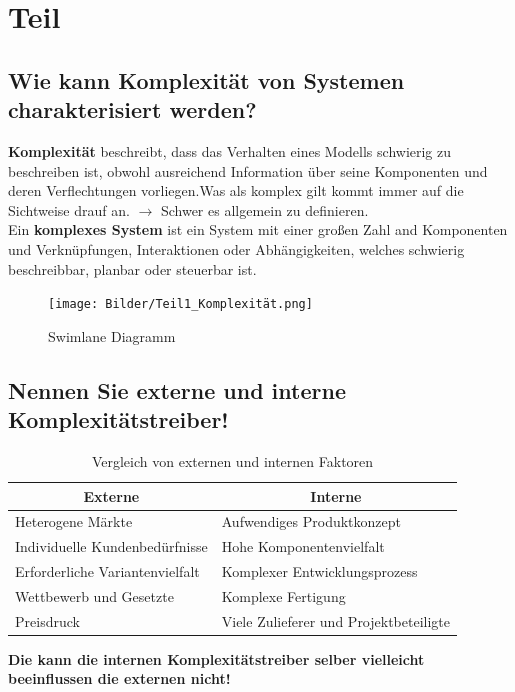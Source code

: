 \section{Teil}

\subsection{Wie kann Komplexität von Systemen charakterisiert werden?}
\textbf{Komplexität} beschreibt, dass das Verhalten eines Modells schwierig zu beschreiben ist, obwohl ausreichend Information über seine Komponenten
 und deren Verflechtungen vorliegen.Was als komplex gilt kommt immer auf die Sichtweise drauf an. $\rightarrow$ Schwer es allgemein zu definieren.
\\

Ein \textbf{komplexes System} ist ein System mit einer großen Zahl and Komponenten und Verknüpfungen, Interaktionen oder Abhängigkeiten, 
welches schwierig beschreibbar, planbar oder steuerbar ist.

\begin{figure}[H]
	\centering
	\texttt{[image: Bilder/Teil1\_Komplexität.png]}
	\caption{Swimlane Diagramm}
\end{figure}

\subsection{Nennen Sie externe und interne Komplexitätstreiber!}
	

\begin{table}[h!]
	\centering
	\begin{tabular}{|p{7cm}|p{7cm}|}
		\hline
		\multicolumn{1}{|c|}{\textbf{Externe}} & \multicolumn{1}{c|}{\textbf{Interne}} \\ \hline
		Heterogene Märkte & Aufwendiges Produktkonzept \\ \hline
		Individuelle Kundenbedürfnisse & Hohe Komponentenvielfalt \\ \hline
		Erforderliche Variantenvielfalt & Komplexer Entwicklungsprozess \\ \hline
		Wettbewerb und Gesetzte & Komplexe Fertigung \\ \hline
		Preisdruck & Viele Zulieferer und Projektbeteiligte \\ \hline
	\end{tabular}
	\caption{Vergleich von externen und internen Faktoren}
	\label{tab:extern-intern}
\end{table}
\textbf{Die kann die internen Komplexitätstreiber selber vielleicht beeinflussen die externen nicht!}

